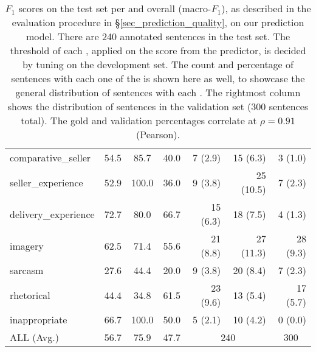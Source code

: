 \begin{table*}[t]
\begin{tabular}{lccc|rr|r}
        comparative\_seller   & 54.5 & 85.7  & 40.0 & 7 (2.9)    & 15 (6.3)   & 3 (1.0) \\
        seller\_experience    & 52.9 & 100.0 & 36.0 & 9 (3.8)    & 25 (10.5)  & 7 (2.3) \\
        delivery\_experience  & 72.7 & 80.0  & 66.7 & 15 (6.3)   & 18 (7.5)   & 4 (1.3) \\
        imagery               & 62.5 & 71.4  & 55.6 & 21 (8.8)   & 27 (11.3)  & 28 (9.3) \\
        sarcasm               & 27.6 & 44.4  & 20.0 & 9 (3.8)    & 20 (8.4)   & 7 (2.3) \\
        rhetorical            & 44.4 & 34.8  & 61.5 & 23 (9.6)   & 13 (5.4)   & 17 (5.7) \\
        inappropriate         & 66.7 & 100.0 & 50.0 & 5 (2.1)    & 10 (4.2)   & 0 (0.0) \\
        \midrule
        ALL (Avg.)            & 56.7 & 75.9  & 47.7 & \multicolumn{2}{c|}{240}                  & \multicolumn{1}{c}{300} \\
        \bottomrule
    \end{tabular}
    \caption{$F_1$ scores on the test set per \taxtype{} and overall (macro-$F_1$), as described in the evaluation procedure in \S{\ref{sec_prediction_quality}}, on our \taxtypes{} prediction model. There are 240 annotated sentences in the test set. The threshold of each \taxtype{}, applied on the score from the predictor, is decided by tuning on the development set. The count and percentage of sentences with each one of the \taxtypes{} is shown here as well, to showcase the general distribution of sentences with each \taxtype{}. The rightmost column shows the distribution of sentences in the validation set (300 sentences total). The gold and validation percentages correlate at $\rho=0.91$ (Pearson).}
    \label{tab_test_scores_per_type}
\end{table*}

